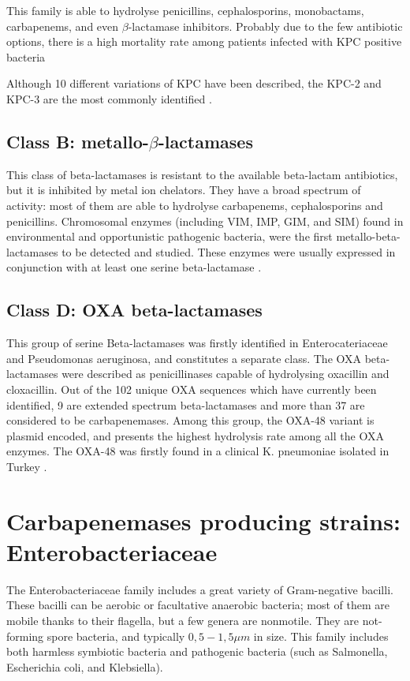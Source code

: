 \documentclass[11pt]{report}
\begin{document}
This family is able to hydrolyse penicillins, cephalosporins, monobactams, carbapenems, and even $\beta$-lactamase inhibitors. 
Probably due to the few antibiotic options, there is a high mortality rate among patients infected with KPC positive bacteria \cite{MunozPrice2013}
                   
Although 10 different variations of KPC have been described, the KPC-2 and KPC-3 are the most commonly identified \cite{WaltherRasmussen2007}.

\section {Class B: metallo-$\beta$-lactamases}
This class of beta-lactamases is resistant to the available beta-lactam antibiotics, but it is inhibited by metal ion chelators.
They have a broad spectrum of activity: most of them are able to hydrolyse carbapenems, cephalosporins and penicillins.
Chromosomal enzymes (including VIM, IMP, GIM, and SIM) found in environmental and opportunistic pathogenic bacteria, were the first metallo-beta-lactamases to be detected and studied.
These enzymes were usually expressed in conjunction with at least one serine beta-lactamase \cite{Queenan2007}.

\section{Class D: OXA beta-lactamases}
This group of serine Beta-lactamases was firstly identified in Enterocateriaceae and Pseudomonas aeruginosa, and constitutes a separate class. 
The OXA beta-lactamases were described as penicillinases capable of hydrolysing oxacillin and cloxacillin. 
Out of the 102 unique OXA sequences which have currently been identified, 9 are extended spectrum beta-lactamases and more than 37 are considered to be carbapenemases.
Among this group, the OXA-48 variant is plasmid encoded, and presents the highest hydrolysis rate among all the OXA enzymes.
The OXA-48 was firstly found in a clinical K. pneumoniae isolated in Turkey \cite{Poirel2012}.

\chapter{Carbapenemases producing strains: Enterobacteriaceae}
The Enterobacteriaceae family includes a great variety of Gram-negative bacilli.
These bacilli can be aerobic or facultative anaerobic bacteria; most of them are mobile thanks to their flagella, but a few genera are nonmotile. 
They are not-forming spore bacteria, and typically $0,5-1,5\mu m$ in size.
This family includes both harmless symbiotic bacteria and pathogenic bacteria (such as Salmonella, Escherichia coli, and Klebsiella).
\end{document}
